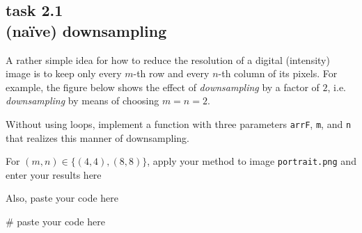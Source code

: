 
\subsection*{task 2.1 \\[1ex] (na\"ive) downsampling}

A rather simple idea for how to reduce the resolution of a digital (intensity) image is to keep only every $m$-th row and every $n$-th column of its pixels. For example, the figure below shows the effect of \emph{downsampling} by a factor of $2$, i.e. \emph{downsampling} by means of choosing $m = n = 2$.

Without using  loops, implement a function  with three parameters \texttt{arrF}, \texttt{m}, and \texttt{n} that realizes this manner of downsampling.

For $(m,n) \in \bigl\{ (4,4), (8,8) \bigr\}$, apply your method to image \texttt{portrait.png} and enter your results here
\begin{figure}[h!]
 \hfill
{} \hfill
{} \hfill
{}
\end{figure}



\vspace{2cm}
Also, paste your code here 
\begin{python}
# paste your code here

\end{python}
